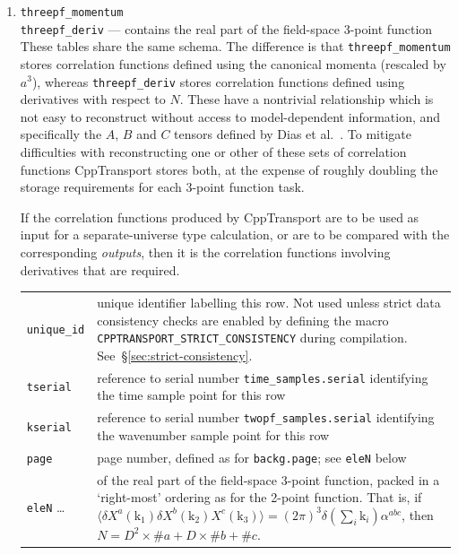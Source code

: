 \documentclass[11pt,a4paper]{article}
\newcommand{\vect}[1]{\bm{\mathrm{{#1}}}}
\newcommand{\packagefont}{\sffamily}
\newcommand{\CppTransport}{{\packagefont CppTransport}}
\newcommand{\semibold}[1]{{\fontseries{b}\selectfont{#1}}}
\newenvironment{sqltablelist}{\renewcommand{\arraystretch}{1.3}\small}{}
\begin{document}
\begin{sqltablelist}
\begin{enumerate}
    \item \texttt{threepf_momentum} \\
    \texttt{threepf_deriv} --- contains
    the real part of the field-space 3-point function \\
    These tables share the same schema. The difference is that
    \texttt{threepf_momentum} stores correlation functions defined using
    the canonical momenta (rescaled by $a^3$), whereas
    \texttt{threepf_deriv} stores correlation functions defined using
    derivatives with respect to $N$.
    These have a nontrivial relationship which is not easy to reconstruct without
    access to model-dependent information, and specifically the $A$, $B$ and
    $C$ tensors defined by Dias et al.~\cite{}.
    To mitigate difficulties with reconstructing one or other of these
    sets of correlation functions {\CppTransport} stores both, at the expense
    of roughly doubling the storage requirements for each 3-point function task.
    
    If the correlation functions produced by {\CppTransport} are to be used as
    input for a separate-universe type calculation,
    or are to be compared with the corresponding \emph{outputs},
    then it is the correlation functions involving derivatives that are required.
    \\
    \begin{tabular}{p{2.5cm}p{11.2cm}}
        \texttt{unique_id} & unique identifier labelling this row. Not used
        unless strict data consistency checks are enabled
        by defining the macro
        \texttt{CPPTRANSPORT_STRICT_CONSISTENCY} during
        compilation. See~\S\ref{sec:strict-consistency}. \\
        \texttt{tserial} & reference to serial number
        \texttt{time_samples.serial} identifying the time sample point for this row \\
        \texttt{kserial} & reference to serial number
        \texttt{twopf_samples.serial} identifying the wavenumber sample point for this row \\
        \texttt{page} & page number, defined as for \texttt{backg.page}; see
        \texttt{eleN} below \\
        \texttt{eleN} \ldots & \semibold{dimensionless components}
        of the real part of the field-space 3-point
        function, packed in a `right-most' ordering as for the 2-point function.
        That is, if
        $\langle \delta X^a(\vect{k}_1) \delta X^b(\vect{k}_2) X^c(\vect{k}_3) \rangle =
        (2\pi)^3 \delta(\sum_i \vect{k}_i) \alpha^{abc}$,
        then
        $N = D^2 \times \#a + D \times \#b + \#c$.
        

\end{tabular}
\end{enumerate}
\end{sqltablelist}
\end{document}
